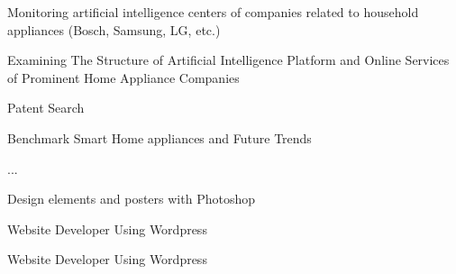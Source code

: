 \documentclass[a4paper]{deedy-resume} %
\begin{document}
\begin{minipage}[t]{0.66\textwidth}
\begin{tightitemize}
\end{tightitemize}

\sectionspace %


\begin{tightitemize}
\item Monitoring artificial intelligence centers of companies related to household appliances (Bosch, Samsung, LG, etc.)
\item Examining The Structure of Artificial Intelligence Platform and Online Services of Prominent Home Appliance Companies
\item Patent Search
\item Benchmark Smart Home appliances and Future Trends 
\item ...

\end{tightitemize}

\sectionspace %


\begin{tightitemize}
\item Design elements and posters with Photoshop 
\item Website Developer Using Wordpress

\end{tightitemize}

\sectionspace %


\begin{tightitemize}
\item Website Developer Using Wordpress

\end{tightitemize}

\sectionspace %






\end{minipage} %
\end{document}

